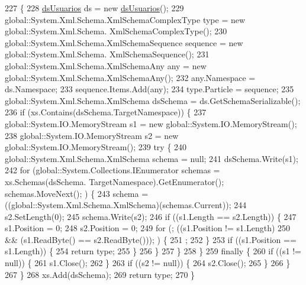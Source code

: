 \begin{DoxyCode}
227                                                                                                            
                             \{
228             \hyperlink{class_proyecto___integrador__3_1_1ds_usuarios_a74b500ded4355addab6e2a2190a26775}{dsUsuarios} ds = \textcolor{keyword}{new} \hyperlink{class_proyecto___integrador__3_1_1ds_usuarios_a74b500ded4355addab6e2a2190a26775}{dsUsuarios}();
229             global::System.Xml.Schema.XmlSchemaComplexType type = \textcolor{keyword}{new} global::System.Xml.Schema.
      XmlSchemaComplexType();
230             global::System.Xml.Schema.XmlSchemaSequence sequence = \textcolor{keyword}{new} global::System.Xml.Schema.
      XmlSchemaSequence();
231             global::System.Xml.Schema.XmlSchemaAny any = \textcolor{keyword}{new} global::System.Xml.Schema.XmlSchemaAny();
232             any.Namespace = ds.Namespace;
233             sequence.Items.Add(any);
234             type.Particle = sequence;
235             global::System.Xml.Schema.XmlSchema dsSchema = ds.GetSchemaSerializable();
236             \textcolor{keywordflow}{if} (xs.Contains(dsSchema.TargetNamespace)) \{
237                 global::System.IO.MemoryStream s1 = \textcolor{keyword}{new} global::System.IO.MemoryStream();
238                 global::System.IO.MemoryStream s2 = \textcolor{keyword}{new} global::System.IO.MemoryStream();
239                 \textcolor{keywordflow}{try} \{
240                     global::System.Xml.Schema.XmlSchema schema = null;
241                     dsSchema.Write(s1);
242                     \textcolor{keywordflow}{for} (global::System.Collections.IEnumerator schemas = xs.Schemas(dsSchema.
      TargetNamespace).GetEnumerator(); schemas.MoveNext(); ) \{
243                         schema = ((global::System.Xml.Schema.XmlSchema)(schemas.Current));
244                         s2.SetLength(0);
245                         schema.Write(s2);
246                         \textcolor{keywordflow}{if} ((s1.Length == s2.Length)) \{
247                             s1.Position = 0;
248                             s2.Position = 0;
249                             \textcolor{keywordflow}{for} (; ((s1.Position != s1.Length) 
250                                         && (s1.ReadByte() == s2.ReadByte())); ) \{
251                                 ;
252                             \}
253                             \textcolor{keywordflow}{if} ((s1.Position == s1.Length)) \{
254                                 \textcolor{keywordflow}{return} type;
255                             \}
256                         \}
257                     \}
258                 \}
259                 \textcolor{keywordflow}{finally} \{
260                     \textcolor{keywordflow}{if} ((s1 != null)) \{
261                         s1.Close();
262                     \}
263                     \textcolor{keywordflow}{if} ((s2 != null)) \{
264                         s2.Close();
265                     \}
266                 \}
267             \}
268             xs.Add(dsSchema);
269             \textcolor{keywordflow}{return} type;
270         \}
\end{DoxyCode}
